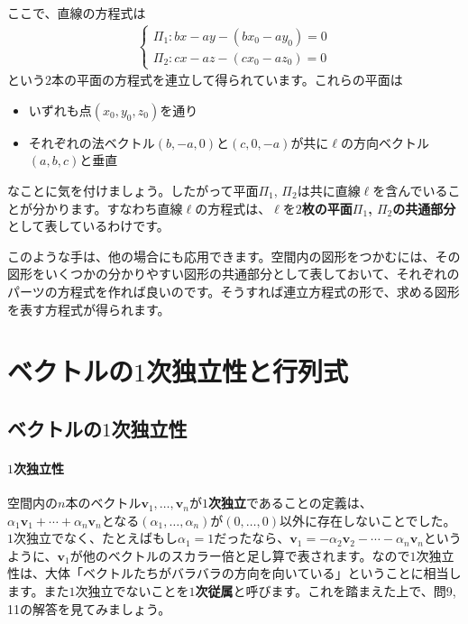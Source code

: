 ここで、直線の方程式は\vspace{-1zw}
\begin{align*}
\begin{cases}
\Pi_1\colon bx - ay - (b x_0 - a y_0) = 0 \\
\Pi_2\colon cx - az - (c x_0 - a z_0) = 0
\end{cases}
\end{align*}
という$2$本の平面の方程式を連立して得られています。これらの平面は
\begin{itemize}
\item いずれも点$(x_0, y_0, z_0)$を通り
\item それぞれの法ベクトル$(b, -a, 0)$と$(c, 0, -a)$が共に$\ell$の方向ベクトル$(a,b,c)$と垂直
\end{itemize}
なことに気を付けましょう。したがって平面$\Pi_1$, $\Pi_2$は共に直線$\ell$を含んでいることが分かります。すなわち直線$\ell$の方程式は、$\ell$を\textbf{$2$枚の平面$\Pi_1$, $\Pi_2$の共通部分}として表しているわけです。

このような手は、他の場合にも応用できます。空間内の図形をつかむには、その図形をいくつかの分かりやすい図形の共通部分として表しておいて、それぞれのパーツの方程式を作れば良いのです。そうすれば連立方程式の形で、求める図形を表す方程式が得られます。

\section{ベクトルの$1$次独立性と行列式}

\subsection{ベクトルの$1$次独立性}

\paragraph{$1$次独立性}
空間内の$n$本のベクトル$\bm{v}_1, \ldots, \bm{v}_n$が\textbf{$1$次独立}であることの定義は、$\alpha_1 \bm{v}_1 + \cdots + \alpha_n \bm{v}_n$となる$(\alpha_1,\ldots,\alpha_n)$が$(0,\ldots,0)$以外に存在しないことでした。$1$次独立でなく、たとえばもし$\alpha_1=1$だったなら、$\bm{v}_1 = -\alpha_2 \bm{v}_2 - \cdots - \alpha_n \bm{v}_n$というように、$\bm{v}_1$が他のベクトルのスカラー倍と足し算で表されます。なので$1$次独立性は、大体「ベクトルたちがバラバラの方向を向いている」ということに相当します。また$1$次独立でないことを\textbf{$1$次従属}と呼びます。これを踏まえた上で、問9, 11の解答を見てみましょう。

